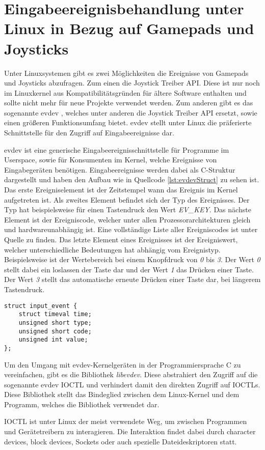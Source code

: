 \section{Eingabeereignisbehandlung unter Linux in Bezug auf Gamepads und Joysticks}
Unter Linuxsystemen gibt es zwei Möglichkeiten die Ereignisse von Gamepads und Joysticks abzufragen. Zum einen die Joystick Treiber \ac{API}. Diese ist nur noch im Linuxkernel aus Kompatibilitätsgründen für ältere Software enthalten und sollte nicht mehr für neue Projekte verwendet werden. Zum anderen gibt es das sogenannte \ac{evdev} \cite{pavlikInput}, welches unter anderen die Joystick Treiber \ac{API} ersetzt, sowie einen größeren Funktionsumfang bietet. \ac{evdev} stellt unter Linux die präferierte Schnittstelle für den Zugriff auf Eingabeereignisse dar. \cites{ragnarJoystick}{pavlikUserspaceAPI}

\ac{evdev} ist eine generische Eingabeereignisschnittstelle für Programme im Userspace, sowie für Konsumenten im Kernel, welche Ereignisse von Eingabegeräten benötigen. Eingabeereignisse werden dabei als C-Struktur dargestellt und haben den Aufbau wie in Quellcode \ref{lst:evdevStruct} zu sehen ist. Das erste Ereigniselement ist der Zeitstempel wann das Ereignis im Kernel aufgetreten ist. Als zweites Element befindet sich der Typ des Ereignisses. Der Typ hat beispielsweise für einen Tastendruck den Wert \textit{EV\_KEY}. Das nächste Element ist der Ereigniscode, welcher unter allen Prozessorarchitekturen gleich und hardwareunabhängig ist. Eine vollständige Liste aller Ereigniscodes ist unter Quelle \cite{linuxInputEvents} zu finden. Das letzte Element eines Ereignisses ist der Ereigniswert, welcher unterschiedliche Bedeutungen hat abhängig vom Ereignistyp. Beispielsweise ist der Wertebereich bei einem Knopfdruck von \textit{0} bis \textit{3}. Der Wert \textit{0} stellt dabei ein loslassen der Taste dar und der Wert \textit{1} das Drücken einer Taste. Der Wert \textit{3} stellt das automatische erneute Drücken einer Taste dar, bei längerem Tastendruck. \cites{pavlikInput}{pavlikUserspaceAPI}

\begin{lstlisting}[caption=C-Strukuraufbau eines Eingabeereignisses von evdev \cite{pavlikInput}, label={lst:evdevStruct}, style=generalStyle]
struct input_event {
    struct timeval time;
    unsigned short type;
    unsigned short code;
    unsigned int value;
};
\end{lstlisting}

Um den Umgang mit \ac{evdev}-Kernelgeräten in der Programmiersprache C zu vereinfachen, gibt es die Bibliothek \textit{libevdev}. Diese abstrahiert den Zugriff auf die sogenannte \ac{evdev} \ac{IOCTL} \cite{ldpIOCTL} und verhindert damit den direkten Zugriff auf \acp{IOCTL}. Diese Bibliothek stellt das Bindeglied zwischen dem Linux-Kernel und dem Programm, welches die Bibliothek verwendet dar. \cites{freedesktopLibevdevDoc}{freedesktopLibevdev}

\ac{IOCTL} ist unter Linux der meist verwendete Weg, um zwischen Programmen und Gerätetreibern zu interagieren. Die Interaktion findet dabei durch character devices, block devices, Sockets oder auch spezielle Dateideskriptoren statt. \cite{linuxIOCTL}